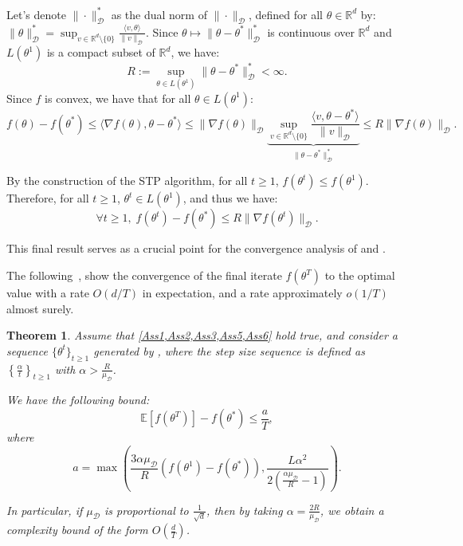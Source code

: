 \documentclass{article} %
\newtheorem{theorem}{Theorem}
\begin{document}
Let's denote $\|\cdot\|_{\mathcal{D}}^*$ as the dual norm of $\|\cdot\|_\mathcal{D}$, defined for all $\theta \in \mathbb{R}^d$ by:
$
\|\theta\|_{\mathcal{D}}^* = \sup_{v \in \mathbb{R}^{d} \setminus \{0\}} \frac{\langle v,\theta \rangle}{\|v\|_{\mathcal{D}}}$. 
Since $\theta \mapsto \|\theta-\theta^{*}\|_{\mathcal{D}}^*$ is continuous over $\mathbb{R}^d$ and $L(\theta^1)$ is a compact subset of $\mathbb{R}^d$, we have:  $$R:=\sup_{\theta \in L(\theta^1)} \|\theta-\theta^{*}\|_{\mathcal{D}}^{*} < \infty.$$
Since $f$ is convex, we have that for all $\theta \in L(\theta^1)$:
$$
    f(\theta)-f(\theta^{*}) \le \langle \nabla f(\theta),\theta-\theta^{*} \rangle 
    \le \|\nabla f(\theta)\|_{\mathcal{D}} \underbrace{\sup_{v \in \mathbb{R}^{d} \setminus \{0\}} \frac{\langle v, \theta-\theta^{*} \rangle}{\|v\|_{\mathcal{D}}}}_{\|\theta-\theta^{*} \|_{\mathcal{D}}^*} 
    \le R \|\nabla f(\theta)\|_{\mathcal{D}}.
$$

By the construction of the STP algorithm, for all \( t \ge 1 \), \( f(\theta^t) \le f(\theta^1) \). Therefore, for all \( t \ge 1 \), \( \theta^t \in L(\theta^1) \), and thus we have:
\begin{equation}\label{eq-cvx}
 \forall t \ge 1, \; f(\theta^t)-f(\theta^{*}) \le R \| \nabla f(\theta^t)\|_{\mathcal{D}}.   
\end{equation}

This final result serves as a crucial point for the convergence analysis of  and .

    

The following~, show the convergence of the final iterate $f(\theta^T)$ to the optimal value with a rate $O(d/T)$ in expectation, and a rate approximately $o(1/T)$ almost surely. 
    

\begin{theorem}\label{Thm4}
Assume that \cref{Ass1,Ass2,Ass3,Ass5,Ass6} hold true, and consider a sequence \( \{\theta^t\}_{t \geq 1} \) generated by , where the step size sequence is defined as \( \left\{ \frac{\alpha}{t} \right\}_{t \geq 1} \) with \( \alpha > \frac{R}{\mu_{\mathcal{D}}} \).

We have the following bound:
\[
\mathbb{E}\left[ f(\theta^T) \right] - f(\theta^{*}) \leq \frac{a}{T},
\]
where 
\[
a = \max \left( \frac{3\alpha \mu_{\mathcal{D}}}{R} \left(f(\theta^1) - f(\theta^{*})\right), \frac{L \alpha^2}{2 \left( \frac{\alpha \mu_{\mathcal{D}}}{R} - 1 \right)} \right).
\]

In particular, if \( \mu_{\mathcal{D}} \) is proportional to \( \frac{1}{\sqrt{d}} \), then by taking \( \alpha = \frac{2R}{\mu_{\mathcal{D}}} \), we obtain a complexity bound of the form \( O\left( \frac{d}{T} \right) \).



\end{theorem}
\end{document}
